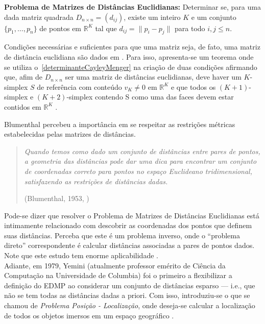 \begin{center}
	\begin{minipage}{0.9 \linewidth}
		\label{EDMP}
		\textbf{Problema de Matrizes de Distâncias Euclidianas:} Determinar se, para uma dada matriz quadrada $D_{n\times n} = (d_{ij})$, existe um inteiro $K$ e um conjunto $\{p_1, \dots, p_n \}$ de pontos em $\mathbb{R}^K$ tal que $d_{ij} = \lVert p_i - p_j\rVert$ para todo $i,j \leq n$.
	\end{minipage}
\end{center} 

Condições necessárias e suficientes para que uma matriz seja, de fato, uma matriz de distância euclidiana são dados em \cite{EDMPResolucao}. Para isso, apresenta-se um teorema onde se utiliza o~\ref{determinanteCayleyMenger} na criação de duas condições afirmando que, afim de $D_{n\times n}$ ser uma matriz de distâncias euclidianas, deve haver um $K$-simplex $S$ de referência com conteúdo $v_K \neq 0$ em $\mathbb{R}^K$ e que todos os $(K+1)$-simplex e $(K+2)$-simplex contendo S como uma das faces devem estar contidos em $\mathbb{R}^K$ \cite{carlileGDandAplications}.

Blumenthal percebeu a importância em se respeitar as restrições métricas estabelecidas pelas matrizes de distâncias.
\begin{quotation}
	\textit{Quando temos como dado um conjunto de distâncias entre pares de pontos, a geometria das distâncias pode dar uma dica para encontrar um conjunto de coordenadas correto para pontos no espaço Euclideano tridimensional, satisfazendo as restrições de distâncias dadas.}
	\begin{flushright}
		(Blumenthal, 1953, \cite{Blumenthal:53})
	\end{flushright}
\end{quotation}

Pode-se dizer que resolver o Problema de Matrizes de Distâncias Euclidianas está intimamente relacionado com descobrir as coordenadas dos pontos que definem suas distâncias. Perceba que este é um problema inverso, onde o ``problema direto'' correspondente é calcular distâncias associadas a pares de pontos dados. Note que este estudo tem enorme aplicabilidade \cite{carlileGDandAplications}.
\\

Adiante, em 1979, Yemini (atualmente professor emérito de Ciência da Computação na Universidade de Columbia) foi o primeiro a flexibilizar a definição do EDMP ao considerar um conjunto de distâncias esparso \cite{Yemini:79,carlileGDandAplications} --- i.e., que não se tem todas as distâncias dadas a priori. Com isso, introduziu-se o que se chamou de \textit{Problema Posição - Localização}, onde deseja-se calcular a localização de todos os objetos imersos em um espaço geográfico \cite{Yemini:79}. 

